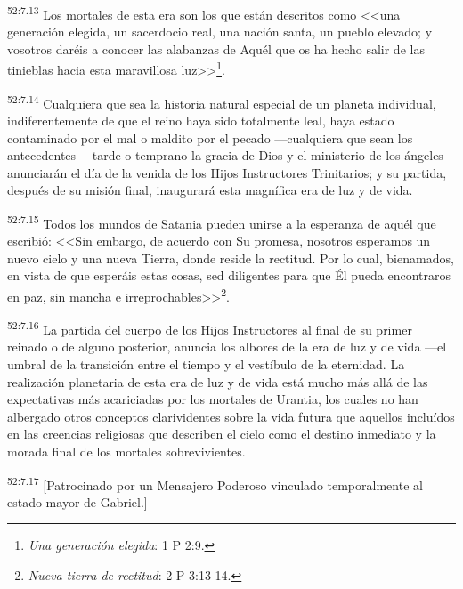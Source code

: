 \par
\textsuperscript{52:7.13} Los mortales de esta era son los que están descritos como <<una generación elegida, un sacerdocio real, una nación santa, un pueblo elevado; y vosotros daréis a conocer las alabanzas de Aquél que os ha hecho salir de las tinieblas hacia esta maravillosa luz>>\footnote{\textit{Una generación elegida}: 1 P 2:9.}.

\par
\textsuperscript{52:7.14} Cualquiera que sea la historia natural especial de un planeta individual, indiferentemente de que el reino haya sido totalmente leal, haya estado contaminado por el mal o maldito por el pecado ---cualquiera que sean los antecedentes--- tarde o temprano la gracia de Dios y el ministerio de los ángeles anunciarán el día de la venida de los Hijos Instructores Trinitarios; y su partida, después de su misión final, inaugurará esta magnífica era de luz y de vida.

\par
\textsuperscript{52:7.15} Todos los mundos de Satania pueden unirse a la esperanza de aquél que escribió: <<Sin embargo, de acuerdo con Su promesa, nosotros esperamos un nuevo cielo y una nueva Tierra, donde reside la rectitud. Por lo cual, bienamados, en vista de que esperáis estas cosas, sed diligentes para que Él pueda encontraros en paz, sin mancha e irreprochables>>\footnote{\textit{Nueva tierra de rectitud}: 2 P 3:13-14.}.

\par
\textsuperscript{52:7.16} La partida del cuerpo de los Hijos Instructores al final de su primer reinado o de alguno posterior, anuncia los albores de la era de luz y de vida ---el umbral de la transición entre el tiempo y el vestíbulo de la eternidad. La realización planetaria de esta era de luz y de vida está mucho más allá de las expectativas más acariciadas por los mortales de Urantia, los cuales no han albergado otros conceptos clarividentes sobre la vida futura que aquellos incluídos en las creencias religiosas que describen el cielo como el destino inmediato y la morada final de los mortales sobrevivientes.

\par
\textsuperscript{52:7.17} [Patrocinado por un Mensajero Poderoso vinculado temporalmente al estado mayor de Gabriel.]